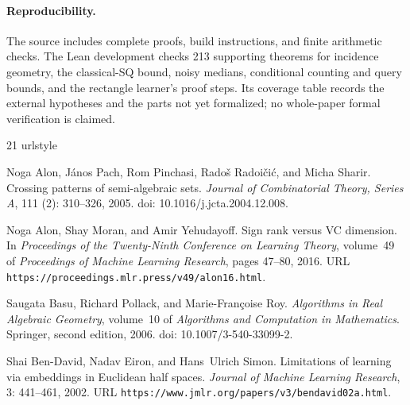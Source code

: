 \documentclass[11pt,letterpaper,pmlr,twoside]{jmlr}
\begin{document}
\paragraph{Reproducibility.}
The source includes complete proofs, build instructions, and finite arithmetic checks. The Lean development checks 213 supporting theorems for incidence geometry, the classical-SQ bound, noisy medians, conditional counting and query bounds, and the rectangle learner's proof steps. Its coverage table records the external hypotheses and the parts not yet formalized; no whole-paper formal verification is claimed.
\label{main-end}


\begin{thebibliography}{21}
\providecommand{\natexlab}[1]{#1}
\providecommand{\url}[1]{\texttt{#1}}
\expandafter\ifx\csname urlstyle\endcsname\relax
  \providecommand{\doi}[1]{doi: #1}\else
  \providecommand{\doi}{doi: \begingroup \urlstyle{rm}\Url}\fi

Noga Alon, J{\'a}nos Pach, Rom Pinchasi, Rado{\v s} Radoi{\v c}i{\'c}, and
  Micha Sharir.
\newblock Crossing patterns of semi-algebraic sets.
\newblock \emph{Journal of Combinatorial Theory, Series A}, 111
  (2): 310--326, 2005.
\newblock \doi{10.1016/j.jcta.2004.12.008}.

Noga Alon, Shay Moran, and Amir Yehudayoff.
\newblock Sign rank versus {VC} dimension.
\newblock In \emph{Proceedings of the Twenty-Ninth Conference on Learning
  Theory}, volume~49 of \emph{Proceedings of Machine Learning Research}, pages
  47--80, 2016.
\newblock URL \url{https://proceedings.mlr.press/v49/alon16.html}.

Saugata Basu, Richard Pollack, and Marie-Fran{\c c}oise Roy.
\newblock \emph{Algorithms in Real Algebraic Geometry}, volume~10 of
  \emph{Algorithms and Computation in Mathematics}.
\newblock Springer, second edition, 2006.
\newblock \doi{10.1007/3-540-33099-2}.

Shai Ben-David, Nadav Eiron, and Hans~Ulrich Simon.
\newblock Limitations of learning via embeddings in {Euclidean} half spaces.
\newblock \emph{Journal of Machine Learning Research}, 3: 441--461,
  2002.
\newblock URL \url{https://www.jmlr.org/papers/v3/bendavid02a.html}.


\end{thebibliography}
\end{document}
